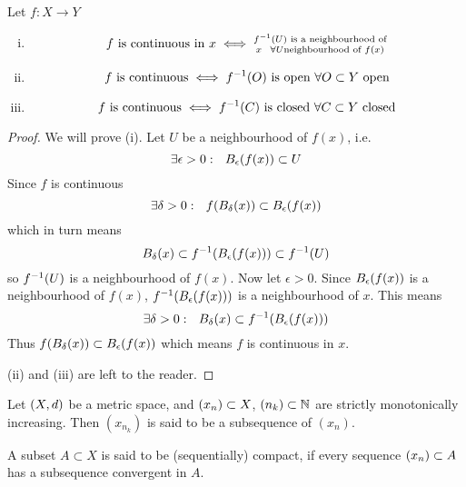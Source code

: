 \documentclass[../../script.tex]{subfiles}
\begin{document}
\begin{thm}
    Let $f: X \rightarrow Y$
    \begin{enumerate}[(i)]
        \item 
        \[
            f \text{ is continuous in } x \iff \substack{\inv{f}(U) \text{ is a neighbourhood of} \\ x ~~\forall U \text{neighbourhood of } f(x)}
        \]

        \item 
        \[
            f \text{ is continuous} \iff \inv{f}(O) \text{ is open } \forall O \subset Y \text{ open}
        \]

        \item 
        \[
            f \text{ is continuous} \iff \inv{f}(C) \text{ is closed } \forall C \subset Y \text{ closed}
        \]
    \end{enumerate}
\end{thm}
\begin{proof}
    We will prove (i). Let $U$ be a neighbourhood of $f(x)$, i.e.
    \begin{equation}
        \exists \epsilon > 0: ~~\oball(f(x)) \subset U
    \end{equation}
    Since $f$ is continuous
    \begin{equation}
        \exists \delta > 0: ~~f(\oball[\delta](x)) \subset \oball(f(x))
    \end{equation}
    which in turn means 
    \begin{equation}
        \oball[\delta](x) \subset \inv{f}(\oball(f(x))) \subset \inv{f}(U)
    \end{equation}
    so $\inv{f}(U)$ is a neighbourhood of $f(x)$. Now let $\epsilon > 0$. 
    Since $\oball(f(x))$ is a neighbourhood of $f(x)$, $\inv{f}(\oball(f(x)))$ is a neighbourhood of $x$. This means 
    \begin{equation}
        \exists \delta > 0: ~~\oball[\delta](x) \subset \inv{f}(\oball(f(x)))
    \end{equation}
    Thus $f(\oball[\delta](x)) \subset \oball(f(x))$ which means $f$ is continuous in $x$.

    (ii) and (iii) are left to the reader.
\end{proof}

\begin{defi}
    Let $\metric$ be a metric space, and $\anyseqdef{X}$, $(n_k) \subset \natn$ are strictly monotonically increasing. 
    Then $(x_{n_k})$ is said to be a subsequence of $(x_n)$.

    A subset $A \subset X$ is said to be (sequentially) compact, if every sequence $\seq{x} \subset A$ has a subsequence convergent in $A$.
\end{defi}
\end{document}
